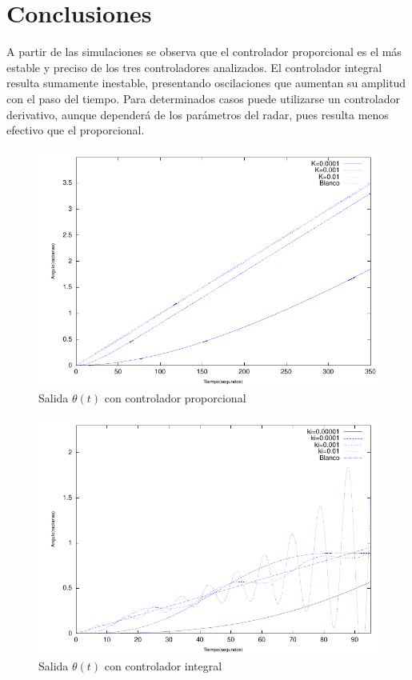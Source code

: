 \documentclass{sig-alternate}
\begin{document}
\section{Conclusiones}\label{conclusiones}
A partir de las simulaciones se observa que el controlador proporcional es el
m\'{a}s estable y preciso de los tres controladores analizados. El
controlador integral resulta sumamente inestable, presentando oscilaciones
que aumentan su amplitud con el paso del tiempo. Para determinados casos puede
utilizarse un controlador derivativo, aunque depender\'{a} de los par\'{a}metros
del radar, pues resulta menos efectivo que el proporcional.

\begin{figure}[hp]
\label{mProporcional}
\centering
\includegraphics[scale=0.8]{graficos/mProporcional}
\caption{Salida $\theta(t)$ con controlador proporcional}
\end{figure}

\begin{figure}[hp]
\label{mIntegral}
\centering
\includegraphics[scale=0.8]{graficos/mIntegral}
\caption{Salida $\theta(t)$ con controlador integral}
\end{figure}
\end{document}
